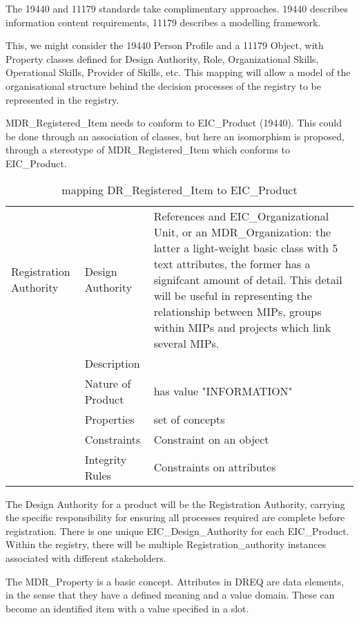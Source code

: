\documentclass[]{elsarticle}
\begin{document}
The 19440 and 11179 standards take complimentary approaches. 19440 describes information content requirements, 11179 describes a modelling framework.

This, we might consider the 19440 Person Profile and a 11179 Object, with Property classes defined for Design Authority, Role, Organizational Skills, Operational Skills, Provider of Skills, etc. This mapping will allow a model of the organisational structure behind the decision processes
of the registry to be represented in the registry.

MDR_Registered_Item needs to conform to EIC_Product (19440). This could be done through an association of classes, but
here an isomorphism is proposed, through a stereotype of MDR_Registered_Item which conforms to EIC_Product.

\begin{table}[h]
\begin{tabular}{|l|l|p{7cm}|}
\hline
Registration Authority & Design Authority & References and EIC_Organizational Unit, or an MDR_Organization: the latter a light-weight basic class with 5 text attributes, the former has a signifcant amount of detail. This detail will be useful in representing the relationship between
MIPs, groups within MIPs and projects which link several MIPs.  \\
& Description & \\
& Nature of Product & has value "INFORMATION" \\
& Properties &  set of concepts  \\
& Constraints & Constraint on an object \\
& Integrity Rules &  Constraints on attributes\\
\hline
\end{tabular}
\caption{mapping DR_Registered_Item to EIC_Product}
\end{table}


The Design Authority for a product will be the Registration Authority, carrying the specific responsibility for ensuring all processes required
are complete before registration. There is one unique EIC_Design_Authority for each EIC_Product. Within the registry, there will be multiple Registration_authority instances associated with different stakeholders. 

The MDR_Property is a basic concept. Attributes in DREQ are data elements, in the sense that they have a defined meaning and a value domain.
These can become an identified item with a value specified in a slot.
\end{document}
